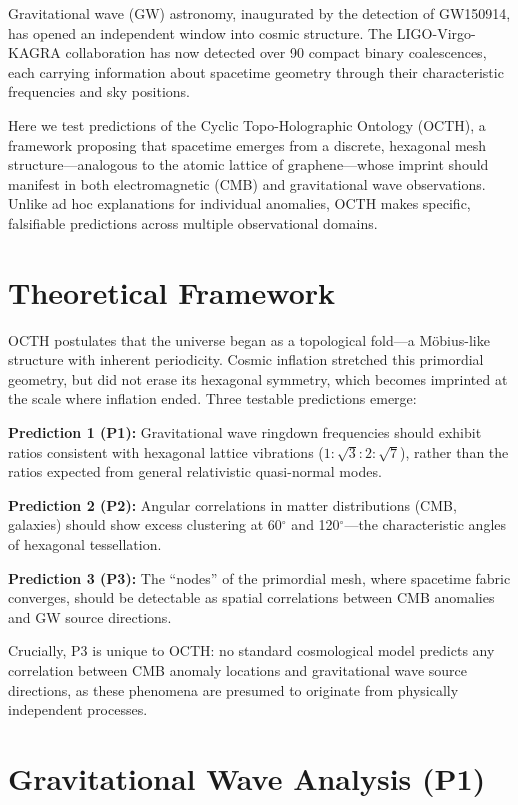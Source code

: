 \documentclass[11pt,a4paper]{article}
\begin{document}
Gravitational wave (GW) astronomy, inaugurated by the detection of GW150914\cite{abbott2016}, has opened an independent window into cosmic structure. The LIGO-Virgo-KAGRA collaboration has now detected over 90 compact binary coalescences\cite{gwtc3}, each carrying information about spacetime geometry through their characteristic frequencies and sky positions.

Here we test predictions of the Cyclic Topo-Holographic Ontology (OCTH), a framework proposing that spacetime emerges from a discrete, hexagonal mesh structure---analogous to the atomic lattice of graphene---whose imprint should manifest in both electromagnetic (CMB) and gravitational wave observations. Unlike ad hoc explanations for individual anomalies, OCTH makes specific, falsifiable predictions across multiple observational domains.

\section*{Theoretical Framework}

OCTH postulates that the universe began as a topological fold---a M\"obius-like structure with inherent periodicity. Cosmic inflation stretched this primordial geometry, but did not erase its hexagonal symmetry, which becomes imprinted at the scale where inflation ended\cite{mobius2024}. Three testable predictions emerge:

\textbf{Prediction 1 (P1):} Gravitational wave ringdown frequencies should exhibit ratios consistent with hexagonal lattice vibrations ($1:\sqrt{3}:2:\sqrt{7}$), rather than the ratios expected from general relativistic quasi-normal modes.

\textbf{Prediction 2 (P2):} Angular correlations in matter distributions (CMB, galaxies) should show excess clustering at 60$^\circ$ and 120$^\circ$---the characteristic angles of hexagonal tessellation.

\textbf{Prediction 3 (P3):} The ``nodes'' of the primordial mesh, where spacetime fabric converges, should be detectable as spatial correlations between CMB anomalies and GW source directions.

Crucially, P3 is unique to OCTH: no standard cosmological model predicts any correlation between CMB anomaly locations and gravitational wave source directions, as these phenomena are presumed to originate from physically independent processes.

\section*{Gravitational Wave Analysis (P1)}
\end{document}
